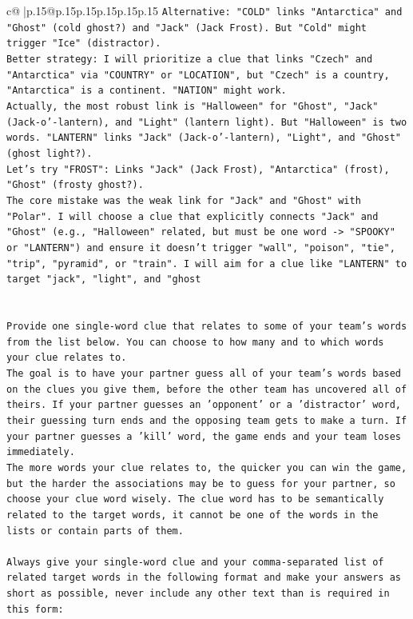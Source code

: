 \documentclass{article}
\begin{document}
{\begin{supertabular}{c@{$\;$}|p{.15\linewidth}@{}p{.15\linewidth}p{.15\linewidth}p{.15\linewidth}p{.15\linewidth}p{.15\linewidth}}
{{{\texttt{Alternative: "COLD" links "Antarctica" and "Ghost" (cold ghost?) and "Jack" (Jack Frost). But "Cold" might trigger "Ice" (distractor).} \\
\texttt{Better strategy: I will prioritize a clue that links "Czech" and "Antarctica" via "COUNTRY" or "LOCATION", but "Czech" is a country, "Antarctica" is a continent. "NATION" might work.} \\
\texttt{Actually, the most robust link is "Halloween" for "Ghost", "Jack" (Jack{-}o'{-}lantern), and "Light" (lantern light). But "Halloween" is two words. "LANTERN" links "Jack" (Jack{-}o'{-}lantern), "Light", and "Ghost" (ghost light?).} \\
\texttt{Let's try "FROST": Links "Jack" (Jack Frost), "Antarctica" (frost), "Ghost" (frosty ghost?).} \\
\texttt{The core mistake was the weak link for "Jack" and "Ghost" with "Polar". I will choose a clue that explicitly connects "Jack" and "Ghost" (e.g., "Halloween" related, but must be one word {-}> "SPOOKY" or "LANTERN") and ensure it doesn't trigger "wall", "poison", "tie", "trip", "pyramid", or "train". I will aim for a clue like "LANTERN" to target "jack", "light", and "ghost} \\
\\ 
\\ 
\texttt{Provide one single{-}word clue that relates to some of your team's words from the list below. You can choose to how many and to which words your clue relates to.} \\
\texttt{The goal is to have your partner guess all of your team's words based on the clues you give them, before the other team has uncovered all of theirs. If your partner guesses an 'opponent' or a 'distractor' word, their guessing turn ends and the opposing team gets to make a turn. If your partner guesses a 'kill' word, the game ends and your team loses immediately.} \\
\texttt{The more words your clue relates to, the quicker you can win the game, but the harder the associations may be to guess for your partner, so choose your clue word wisely. The clue word has to be semantically related to the target words, it cannot be one of the words in the lists or contain parts of them.} \\
\\ 
\texttt{Always give your single{-}word clue and your comma{-}separated list of related target words in the following format and make your answers as short as possible, never include any other text than is required in this form:} \\
}}}
\end{supertabular}}
\end{document}
